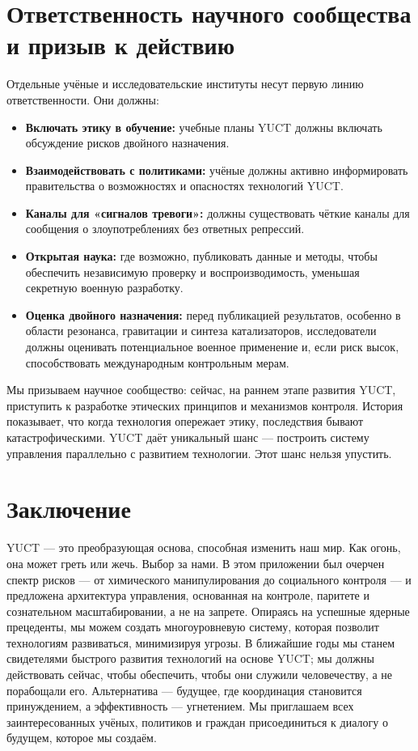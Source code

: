 \documentclass[12pt,a4paper]{article}
\theoremstyle{remark}
\begin{document}
	\section{Ответственность научного сообщества и призыв к действию}
	\label{sec:scientists}
	
	Отдельные учёные и исследовательские институты несут первую линию ответственности. Они должны:
	\begin{itemize}[leftmargin=*]
		\item \textbf{Включать этику в обучение:} учебные планы YUCT должны включать обсуждение рисков двойного назначения.
		\item \textbf{Взаимодействовать с политиками:} учёные должны активно информировать правительства о возможностях и опасностях технологий YUCT.
		\item \textbf{Каналы для «сигналов тревоги»:} должны существовать чёткие каналы для сообщения о злоупотреблениях без ответных репрессий.
		\item \textbf{Открытая наука:} где возможно, публиковать данные и методы, чтобы обеспечить независимую проверку и воспроизводимость, уменьшая секретную военную разработку.
		\item \textbf{Оценка двойного назначения:} перед публикацией результатов, особенно в области резонанса, гравитации и синтеза катализаторов, исследователи должны оценивать потенциальное военное применение и, если риск высок, способствовать международным контрольным мерам.
	\end{itemize}
	
	Мы призываем научное сообщество: сейчас, на раннем этапе развития YUCT, приступить к разработке этических принципов и механизмов контроля. История показывает, что когда технология опережает этику, последствия бывают катастрофическими. YUCT даёт уникальный шанс — построить систему управления параллельно с развитием технологии. Этот шанс нельзя упустить.
	
	\section{Заключение}
	\label{sec:conclusion}
	
	YUCT — это преобразующая основа, способная изменить наш мир. Как огонь, она может греть или жечь. Выбор за нами. В этом приложении был очерчен спектр рисков — от химического манипулирования до социального контроля — и предложена архитектура управления, основанная на контроле, паритете и сознательном масштабировании, а не на запрете. Опираясь на успешные ядерные прецеденты, мы можем создать многоуровневую систему, которая позволит технологиям развиваться, минимизируя угрозы. В ближайшие годы мы станем свидетелями быстрого развития технологий на основе YUCT; мы должны действовать сейчас, чтобы обеспечить, чтобы они служили человечеству, а не порабощали его. Альтернатива — будущее, где координация становится принуждением, а эффективность — угнетением. Мы приглашаем всех заинтересованных учёных, политиков и граждан присоединиться к диалогу о будущем, которое мы создаём.
	
\end{document}
